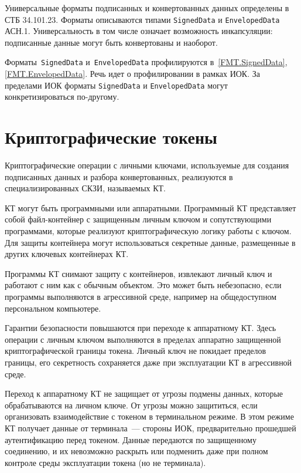 Универсальные форматы подписанных и конвертованных данных определены в СТБ 
34.101.23. Форматы описываются типами  \texttt{SignedData} и 
\texttt{EnvelopedData} АСН.1.
%
Универсальность в том числе означает возможность инкапсуляции:
подписанные данные могут быть конвертованы и наоборот.

Форматы~\texttt{SignedData} и~\texttt{EnvelopedData} профилируются 
в~\ref{FMT.SignedData}, \ref{FMT.EnvelopedData}.  
Речь идет о профилировании в рамках ИОК. За пределами ИОК форматы
\texttt{SignedData} и \texttt{EnvelopedData} могут конкретизироваться 
по-другому. 

\section{Криптографические токены}

Криптографические операции с личными ключами, используемые для создания 
подписанных данных и разбора конвертованных, реализуются в 
специализированных СКЗИ, называемых КТ.
                                        
КТ могут быть программными или аппаратными.
Программный КТ представляет собой файл-контейнер с защищенным личным 
ключом и сопутствующими программами, которые реализуют криптографическую 
логику работы с ключом. Для защиты контейнера могут использоваться 
секретные данные, размещенные в других ключевых контейнерах КТ.

Программы КТ снимают защиту с контейнеров, извлекают личный ключ и 
работают с ним как с обычным объектом. Это может быть небезопасно, если
программы выполняются в агрессивной среде, например на общедоступном 
персональном компьютере. 

Гарантии безопасности повышаются при переходе к аппаратному КТ.
Здесь операции с личным ключом выполняются в пределах аппаратно защищенной 
криптографической границы токена. Личный ключ не покидает пределов границы,
его секретность сохраняется даже при эксплуатации КТ в агрессивной среде.

Переход к аппаратному КТ не защищает от угрозы подмены данных,
которые обрабатываются на личном ключе. От угрозы можно защититься,
если организовать взаимодействие с токеном в терминальном режиме.
В этом режиме КТ получает данные от терминала~--- стороны ИОК, 
предварительно прошедшей аутентификацию перед токеном. Данные передаются 
по защищенному соединению, и их невозможно раскрыть или подменить
даже при полном контроле среды эксплуатации токена (но не терминала).

